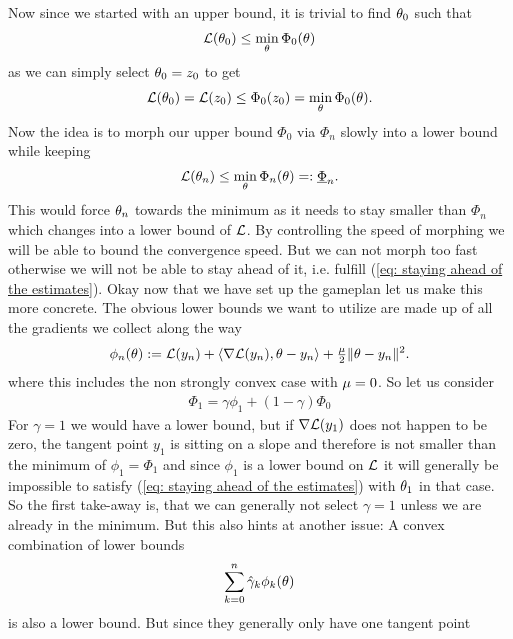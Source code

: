 Now since we started with an upper bound, it is trivial to find \(\theta_0\)
such that
\begin{align*}
	\mathcal{L}(\theta_0) \le \min_{\theta}\Phi_0(\theta)
\end{align*}
as we can simply select \(\theta_0=z_0\) to get
\begin{align*}
	\mathcal{L}(\theta_0) =\mathcal{L}(z_0) \le \Phi_0(z_0) = \min_{\theta}\Phi_0(\theta).
\end{align*}
Now the idea is to morph our upper bound \(\Phi_0\) via \(\Phi_n\) slowly into
a lower bound while keeping 
\begin{align}\label{eq: staying ahead of the estimates}
	\mathcal{L}(\theta_n) \le \min_{\theta}\Phi_n(\theta)=:\underline{\Phi}_n.
\end{align}
This would force \(\theta_n\) towards the minimum as it needs to stay smaller
than \(\Phi_n\) which changes into a lower bound of \(\mathcal{L}\). By controlling
the speed of morphing we will be able to bound the convergence speed. But we
can not morph too fast otherwise we will not be able to stay ahead of it, i.e.
fulfill (\ref{eq: staying ahead of the estimates}). Okay now that we have set
up the gameplan let us make this more concrete.
The obvious lower bounds we want to utilize are made up of all the gradients we
collect along the way
\begin{align*}
	\phi_n(\theta)
	:= \mathcal{L}(y_n) + \langle\nabla\mathcal{L}(y_n), \theta-y_n\rangle
	+ \tfrac{\mu}{2}\|\theta-y_n\|^2.
\end{align*}
where this includes the non strongly convex case with \(\mu=0\). So let
us consider
\begin{align*}
	\Phi_1 = \gamma \phi_1 + (1-\gamma)\Phi_0
\end{align*}
For \(\gamma=1\) we would have a lower bound, but if \(\nabla\mathcal{L}(y_1)\)
does not happen to be zero, the tangent point \(y_1\) is sitting on a slope and
therefore is not smaller than the minimum of \(\phi_1=\Phi_1\) and since \(\phi_1\)
is a lower bound on \(\mathcal{L}\) it will generally be impossible to satisfy
(\ref{eq: staying ahead of the estimates}) with \(\theta_1\) in that case.
So the first take-away is, that we can generally not select \(\gamma=1\)
unless we are already in the minimum. But this also hints at another issue:
A convex combination of lower bounds
\begin{align*}
	\sum_{k=0}^n \hat{\gamma}_k \phi_k(\theta)
\end{align*}
is also a lower bound. But since they generally only have one tangent point
